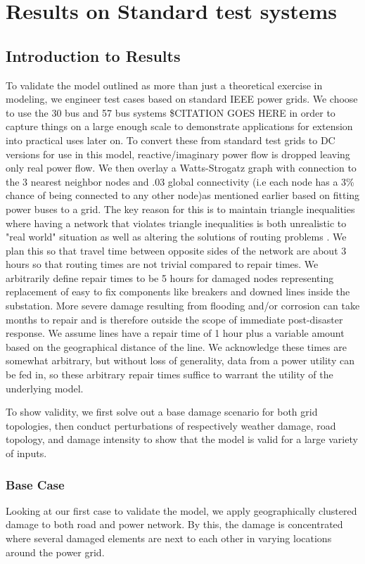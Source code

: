 \documentclass{article}
\begin{document}
	\section{Results on Standard test systems}
	\subsection{Introduction to Results}
	To validate the model outlined as more than just a theoretical exercise in modeling, we engineer test cases based on standard IEEE power grids. We choose to use the 30 bus and 57 bus systems \$CITATION GOES HERE in order to capture things on a large enough scale to demonstrate applications for extension into practical uses later on. To convert these from standard test grids to DC versions for use in this model, reactive/imaginary power flow is dropped leaving only real power flow. We then overlay a Watts-Strogatz graph with connection to the 3 nearest neighbor nodes and .03 global connectivity (i.e each node has a 3\% chance of being connected to any other node)as mentioned earlier based on fitting power buses to a grid. The key reason for this is to maintain triangle inequalities where having a network that violates triangle inequalities is both unrealistic to "real world" situation as well as altering the solutions of routing problems \cite{FlemingEA2013}. We plan this so that travel time between opposite sides of the network are about 3 hours so that routing times are not trivial compared to repair times. We arbitrarily define repair times to be 5 hours for damaged nodes representing replacement of easy to fix components like breakers and downed lines inside the substation. More severe damage resulting from flooding and/or corrosion can take months to repair and is therefore outside the scope of immediate post-disaster response. We assume lines have a repair time of 1 hour plus a variable amount based on the geographical distance of the line. We acknowledge these times are somewhat arbitrary, but without loss of generality, data from a power utility can be fed in, so these arbitrary repair times suffice to warrant the utility of the underlying model.
	
	To show validity, we first solve out a base damage scenario for both grid topologies, then conduct perturbations of respectively weather damage, road topology, and damage intensity to show that the model is valid for a large variety of inputs. 
	
	\subsubsection{Base Case}
	Looking at our first case to validate the model, we apply geographically clustered damage to both road and power network. By this, the damage is concentrated where several damaged elements are next to each other in varying locations around the power grid. 
	
\end{document}
